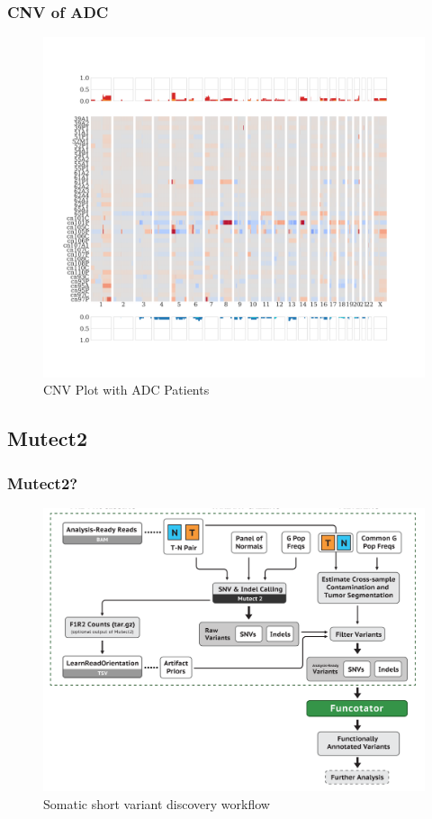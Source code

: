 \documentclass{beamer}
\begin{document}
    \begin{frame}
        \frametitle{CNV of ADC}

        \begin{figure}
            \includegraphics[height=0.7 \textheight]{figures/Sequenza/BWA-genome-ADC.pdf}
            \caption{CNV Plot with ADC Patients}
        \end{figure}
    \end{frame}

    \subsection{Mutect2}
    \begin{frame}
        \frametitle{Mutect2?}

        \begin{figure}
            \includegraphics[width=0.6 \linewidth]{figures/Workflow/somatic_short_variants.png}
            \caption{Somatic short variant discovery workflow \protect\cite{gatk1, gatk2}}
        \end{figure}
    \end{frame}
\end{document}
